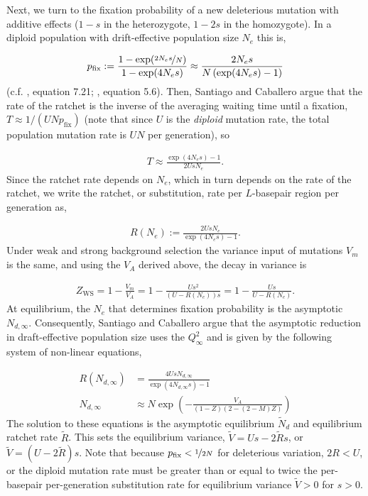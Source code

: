 \documentclass[11pt]{article}
\begin{document}
Next, we turn to the fixation probability of a new deleterious mutation with
additive effects ($1-s$ in the heterozygote, $1-2s$ in the homozygote). In a
diploid population with drift-effective population size $N_e$ this is,

\begin{align}
  p_\text{fix} := \frac{1-\exp(\nicefrac{2 N_e s}{N})}{1-\exp(4 N_e s)} \approx
  \frac{2 N_e s}{N \left(\exp(4 N_e s)-1\right)}
\end{align}
%
(c.f. \cite{Durrett2008-ql}, equation 7.21; \cite{Kimura1957-rk}, equation
5.6). Then, Santiago and Caballero argue that the rate of the ratchet is the
inverse of the averaging waiting time until a fixation, $T \approx 1/(UN
p_\text{fix})$ (note that since $U$ is the \emph{diploid} mutation rate, the
total population mutation rate is $UN$ per generation), so

\begin{align}
  T \approx \frac{\exp(4 N_e s)-1}{2 U s N_e}.
\end{align}
%
Since the ratchet rate depends on $N_e$, which in turn depends on the rate of
the ratchet, we write the ratchet, or substitution, rate per $L$-basepair
region per generation as,

\begin{align}
  R(N_e) := \frac{2 U s N_e}{\exp(4 N_e s)-1}.
\end{align}
%
Under weak and strong background selection the variance input of mutations
$V_m$ is the same, and using the $V_A$ derived above, the decay in variance is

\begin{align}
  Z_\text{WS} = 1 - \frac{V_m}{V_A} = 1 - \frac{Us^2}{(U-R(N_e))s} = 1 - \frac{Us}{U-R(N_e)}.
\end{align}
%
At equilibrium, the $N_e$ that determines fixation probability is the
asymptotic $N_{d,\infty}$. Consequently, Santiago and Caballero argue that the
asymptotic reduction in draft-effective population size uses the $Q_\infty^2$ and is
given by the following system of non-linear equations,

\begin{align}
    \label{supp-eq:sc16-sys}
  R(N_{d,\infty}) &= \frac{4 U s N_{d,\infty}}{\exp(4 N_{d,\infty} s)-1}\\
  N_{d,\infty} &\approx N \exp\left(-\frac{V_A}{(1-Z) (2-(2-M) Z)} \right)
\end{align}
%
The solution to these equations is the asymptotic equilibrium $\widetilde{N}_d$
and equilibrium ratchet rate $\widetilde{R}$. This sets the equilibrium
variance, $\widetilde{V} = Us - 2\widetilde{R}s$, or $\widetilde{V} = (U -
2\widetilde{R})s$. Note that because $p_\text{fix} < \nicefrac{1}{2N}$ for
deleterious variation, $2R < U$, or the diploid mutation rate must be greater
than or equal to twice the per-basepair per-generation substitution rate for
equilibrium variance $\widetilde{V} > 0$ for $s>0$. 
\end{document}
